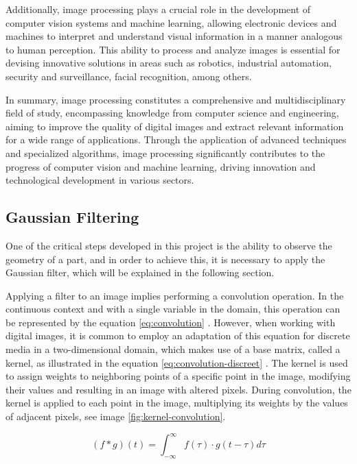 Additionally, image processing plays a crucial role in the development of computer vision systems and machine learning, allowing electronic devices and machines to interpret and understand visual information in a manner analogous to human perception. This ability to process and analyze images is essential for devising innovative solutions in areas such as robotics, industrial automation, security and surveillance, facial recognition, among others.

In summary, image processing constitutes a comprehensive and multidisciplinary field of study, encompassing knowledge from computer science and engineering, aiming to improve the quality of digital images and extract relevant information for a wide range of applications. Through the application of advanced techniques and specialized algorithms, image processing significantly contributes to the progress of computer vision and machine learning, driving innovation and technological development in various sectors.


\subsection{Gaussian Filtering}

One of the critical steps developed in this project is the ability to observe the geometry of a part, and in order to achieve this, it is necessary to apply the Gaussian filter, which will be explained in the following section.

Applying a filter to an image implies performing a convolution operation. In the continuous context and with a single variable in the domain, this operation can be represented by the equation \ref{eq:convolution} \cite{spiegel_schaums_1974}. However, when working with digital images, it is common to employ an adaptation of this equation for discrete media in a two-dimensional domain, which makes use of a base matrix, called a kernel, as illustrated in the equation \ref{eq:convolution-discreet} \cite{gonzalez_rafael_c_digital_2018}. The kernel is used to assign weights to neighboring points of a specific point in the image, modifying their values and resulting in an image with altered pixels. During convolution, the kernel is applied to each point in the image, multiplying its weights by the values of adjacent pixels, see image \ref{fig:kernel-convolution}.

\begin{equation}
(f * g)(t) = \int_{-\infty}^{\infty} f(\tau) \cdot g(t-\tau) d\tau
\label{eq:convolution}
\end{equation}

